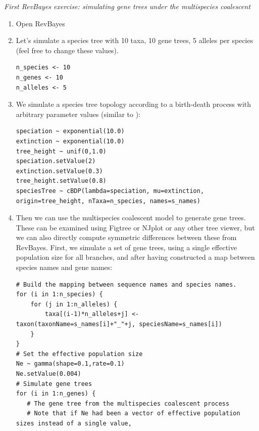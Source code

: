 \documentclass[11pt]{article}
\begin{document}
{\begin{framed}

\begin{center}
\emph{First RevBayes exercise: simulating gene trees under the multispecies coalescent}
\end{center}
\begin{enumerate}
\item Open RevBayes
\item Let's simulate a species tree with 10 taxa, 10 gene trees, 5 alleles per species (feel free to change these values).
{\tt \begin{snugshade*}
\begin{lstlisting}
n_species <- 10
n_genes <- 10
n_alleles <- 5
\end{lstlisting}
\end{snugshade*}}
\item We simulate a species tree topology according to a birth-death process with arbitrary parameter values (similar to \citet{Leache2011}):
{\tt \begin{snugshade*}
\begin{lstlisting}
speciation ~ exponential(10.0)
extinction ~ exponential(10.0)
tree_height ~ unif(0,1.0)
speciation.setValue(2)
extinction.setValue(0.3)
tree_height.setValue(0.8)
speciesTree ~ cBDP(lambda=speciation, mu=extinction, origin=tree_height, nTaxa=n_species, names=s_names)
\end{lstlisting}
\end{snugshade*}}
\item Then we can use the multispecies coalescent model to generate gene trees. These can be examined using Figtree or NJplot or any other tree viewer, but we can also directly compute symmetric differences between these from RevBayes. First, we simulate a set of gene trees, using a single effective population size for all branches, and after having constructed a map between species names and gene names:
{\tt \begin{snugshade*}
\begin{lstlisting}
# Build the mapping between sequence names and species names.
for (i in 1:n_species) {
	for (j in 1:n_alleles) {
		taxa[(i-1)*n_alleles+j] <- taxon(taxonName=s_names[i]+"_"+j, speciesName=s_names[i])
	}
}
# Set the effective population size
Ne ~ gamma(shape=0.1,rate=0.1)
Ne.setValue(0.004)
# Simulate gene trees
for (i in 1:n_genes) {
   # The gene tree from the multispecies coalescent process
   # Note that if Ne had been a vector of effective population sizes instead of a single value, 

\end{lstlisting}
\end{snugshade*}}
\end{enumerate}
\end{framed}}
\end{document}
